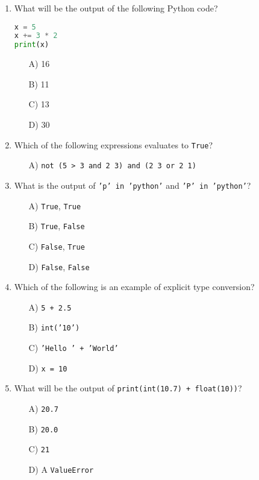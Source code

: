 \documentclass[9pt]{article}
\begin{document}
\begin{multicols}{2}
\begin{enumerate}
\item What will be the output of the following Python code?
\begin{lstlisting}[language=Python]
x = 5
x += 3 * 2
print(x)
\end{lstlisting}
\begin{enumerate}
\item[A)] 16
\item[B)] 11
\item[C)] 13
\item[D)] 30
\end{enumerate}

\item Which of the following expressions evaluates to \texttt{True}?
\begin{enumerate}
    \item[A)] \texttt{not (5 > 3 and 2  3) and (2  3 or 2  1)}
\end{enumerate}

\item What is the output of \texttt{'p' in 'python'} and \texttt{'P' in 'python'}?
\begin{enumerate}
    \item[A)] \texttt{True}, \texttt{True}
    \item[B)] \texttt{True}, \texttt{False}
    \item[C)] \texttt{False}, \texttt{True}
    \item[D)] \texttt{False}, \texttt{False}
\end{enumerate}

\item Which of the following is an example of explicit type conversion?
\begin{enumerate}
    \item[A)] \texttt{5 + 2.5}
    \item[B)] \texttt{int('10')}
    \item[C)] \texttt{'Hello ' + 'World'}
    \item[D)] \texttt{x = 10}
\end{enumerate}

\item What will be the output of \texttt{print(int(10.7) + float(10))}?
\begin{enumerate}
    \item[A)] \texttt{20.7}
    \item[B)] \texttt{20.0}
    \item[C)] \texttt{21}
    \item[D)] A \texttt{ValueError}
\end{enumerate}


\end{enumerate}
\end{multicols}
\end{document}
